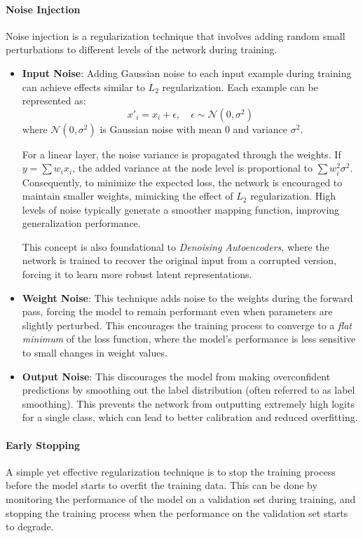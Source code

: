 \paragraph{Noise Injection}
Noise injection is a regularization technique that involves adding random small perturbations to different 
levels of the network during training.
\begin{itemize}
    \item \textbf{Input Noise}: Adding Gaussian noise to each input example during training can achieve effects similar to $L_2$ regularization. 
    Each example can be represented as:
    \[ x'_i = x_i + \epsilon, \quad \epsilon \sim \mathcal{N}(0, \sigma^2) \]
    where $\mathcal{N}(0, \sigma^2)$ is Gaussian noise with mean 0 and variance $\sigma^2$. 

    For a linear layer, the noise variance is propagated through the weights. 
    If $y = \sum w_i x_i$, the added variance at the node level is proportional to $\sum w_i^2 \sigma^2$. 
    Consequently, to minimize the expected loss, the network is encouraged to maintain smaller weights, mimicking the effect of $L_2$ regularization. 
    High levels of noise typically generate a smoother mapping function, improving generalization performance.

    This concept is also foundational to \textit{Denoising Autoencoders}, where the network is trained to recover the original input 
    from a corrupted version, forcing it to learn more robust latent representations.

    \item \textbf{Weight Noise}: This technique adds noise to the weights during the forward pass, 
    forcing the model to remain performant even when parameters are slightly perturbed. 
    This encourages the training process to converge to a \textit{flat minimum} of the loss function, 
    where the model's performance is less sensitive to small changes in weight values.

    \item \textbf{Output Noise}: This discourages the model from making overconfident predictions by smoothing out the label distribution (often referred to as label smoothing). 
    This prevents the network from outputting extremely high logits for a single class, which can lead to better calibration and reduced overfitting.
\end{itemize}

\paragraph{Early Stopping}
A simple yet effective regularization technique is to stop the training process before the model starts to overfit the training data.
This can be done by monitoring the performance of the model on a validation set during training, and stopping the training process when the 
performance on the validation set starts to degrade.

